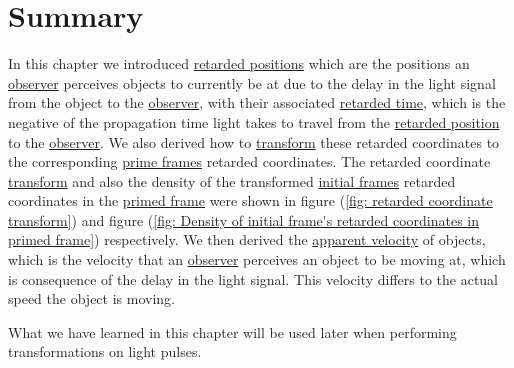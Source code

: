
\section{Summary}\label{sect: Summary chapter 4}

In this chapter we introduced \hyperlink{def-retarded-position}{retarded positions} which are the positions an \hyperlink{def-observer}{observer} perceives objects to currently be at due to the delay in the light signal from the object to the \hyperlink{def-observer}{observer}, with their associated \hyperlink{def-retarded-time}{retarded time}, which is the negative of the propagation time light takes to travel from the \hyperlink{def-retarded-position}{retarded position} to the \hyperlink{def-observer}{observer}.
We also derived how to \hyperlink{def-transform}{transform} these retarded coordinates to the corresponding \hyperlink{def-Primed-Frame}{prime frames} retarded coordinates.
The retarded coordinate \hyperlink{def-transform}{transform} and also the density of the transformed \hyperlink{def-initial-Frame}{initial frames} retarded coordinates in the \hyperlink{def-Primed-Frame}{primed frame} were shown in figure (\ref{fig: retarded coordinate transform}) and figure (\ref{fig: Density of initial frame's retarded coordinates in primed frame}) respectively.
We then derived the \hyperlink{def-apparent-velocity}{apparent velocity} of objects, which is the velocity that an \hyperlink{def-observer}{observer} perceives an object to be moving at, which is consequence of the delay in the light signal.
This velocity differs to the actual speed the object is moving.

What we have learned in this chapter will be used later when performing transformations on light pulses.


%

\printbibliography[segment=\therefsegment, heading=subbibliography]


